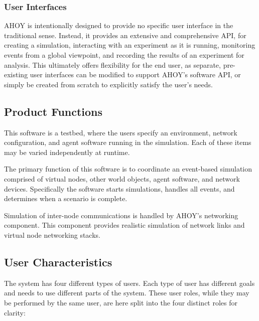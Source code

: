 \documentclass[titlepage]{article}
\begin{document}

\subsubsection{User Interfaces%
  \label{user-interfaces}%
}

AHOY is intentionally designed to provide no specific user interface in the traditional sense. Instead, it provides an extensive and comprehensive API, for creating a simulation, interacting with an experiment as it is running, monitoring events from a global viewpoint, and recording the results of an experiment for analysis. This ultimately offers flexibility for the end user, as separate, pre-existing user interfaces can be modified to support AHOY's software API, or simply be created from scratch to explicitly satisfy the user's needs. 

\subsection{Product Functions%
  \label{product-functions}%
}

This software is a testbed, where the users specify an environment, network configuration, and agent software running in the simulation. Each of these items may be varied independently at runtime.

The primary function of this software is to coordinate an event-based simulation comprised of virtual nodes, other world objects, agent software, and network devices.  Specifically the software starts simulations, handles all events, and determines when a scenario is complete.

Simulation of inter-node communications is handled by AHOY's networking component.  This component provides realistic simulation of network links and virtual node networking stacks.



\subsection{User Characteristics%
  \label{user-characteristics}%
}

The system has four different types of users.  Each type of user has different goals and needs to use different parts of the system.  These user roles, while they may be performed by the same user, are here split into the four distinct roles for clarity:
\end{document}
